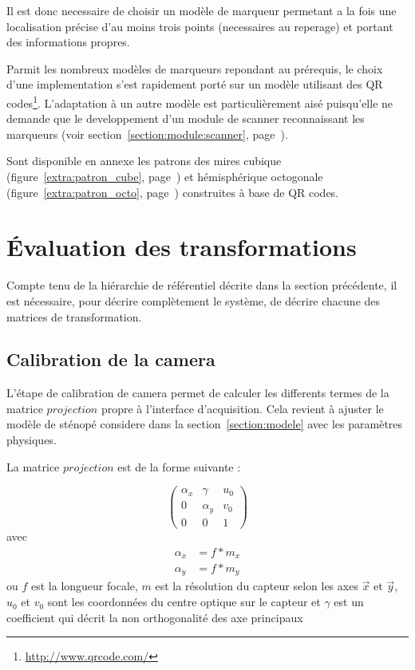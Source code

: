 \documentclass[10pt,a4paper,twoside, twocolumn]{report}
\begin{document}
Il est donc necessaire de choisir un modèle de marqueur permetant a la fois une localisation précise d'au moins trois points (necessaires au reperage) et portant des informations propres.

Parmit les nombreux modèles de marqueurs repondant au prérequis, le choix d'une implementation s'est rapidement porté sur un modèle utilisant des QR codes\footnote{\url{http://www.qrcode.com/}}. L'adaptation à un autre modèle est particulièrement aisé puisqu'elle ne demande que le developpement d'un module de scanner reconnaissant les marqueurs (voir section~\ref{section:module:scanner}, page~\pageref{section:module:scanner}).

Sont disponible en annexe les patrons des mires cubique (figure~\ref{extra:patron_cube}, page~\pageref{extra:patron_cube}) et hémisphérique octogonale (figure~\ref{extra:patron_octo}, page~\pageref{extra:patron_octo}) construites à base de QR codes.



\section{Évaluation des transformations}

Compte tenu de la hiérarchie de référentiel décrite dans la section précédente, il est nécessaire, pour décrire complètement le système, de décrire chacune des matrices de transformation. 


\subsection{Calibration de la camera}

L'étape de calibration de camera permet de calculer les differents termes de la matrice $projection$ propre à l'interface d'acquisition. Cela revient à ajuster le modèle de sténopé considere dans la section~\ref{section:modele} avec les paramètres physiques.

La matrice $projection$ est de la forme suivante :

\begin{equation}
	\begin{pmatrix}
		\alpha_x	&	\gamma		& u_0	\\
		0					&	\alpha_y	&	v_0	\\
		0					&	0					&	1
	\end{pmatrix}
\end{equation}
avec 
\begin{align*}
	\alpha_x	&= f * m_x	\\
	\alpha_y	&= f * m_y
\end{align*}
ou $f$ est la longueur focale, $m$ est la résolution du capteur selon les axes $\vec x$ et $\vec y$, $u_0$ et $v_0$ sont les coordonnées du centre optique sur le capteur et $\gamma$ est un coefficient qui décrit la non orthogonalité des axe principaux
\end{document}
